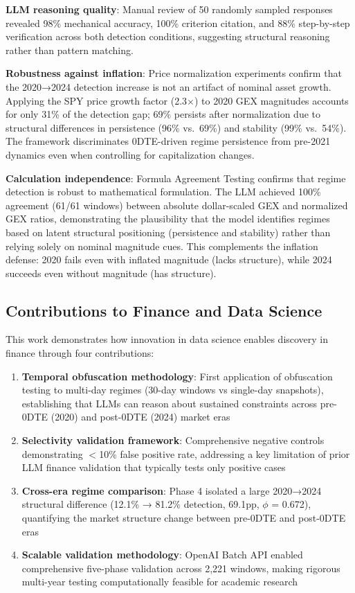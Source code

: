 \textbf{LLM reasoning quality}: Manual review of 50 randomly sampled responses revealed 98\% mechanical accuracy, 100\% criterion citation, and 88\% step-by-step verification across both detection conditions, suggesting structural reasoning rather than pattern matching.

\textbf{Robustness against inflation}: Price normalization experiments confirm that the 2020→2024 detection increase is not an artifact of nominal asset growth. Applying the SPY price growth factor (2.3$\times$) to 2020 GEX magnitudes accounts for only 31\% of the detection gap; 69\% persists after normalization due to structural differences in persistence (96\% vs.\ 69\%) and stability (99\% vs.\ 54\%). The framework discriminates 0DTE-driven regime persistence from pre-2021 dynamics even when controlling for capitalization changes.

\textbf{Calculation independence}: Formula Agreement Testing confirms that regime detection is robust to mathematical formulation. The LLM achieved 100\% agreement (61/61 windows) between absolute dollar-scaled GEX and normalized GEX ratios, demonstrating the plausibility that the model identifies regimes based on latent structural positioning (persistence and stability) rather than relying solely on nominal magnitude cues. This complements the inflation defense: 2020 fails even with inflated magnitude (lacks structure), while 2024 succeeds even without magnitude (has structure).

\subsection{Contributions to Finance and Data Science}

This work demonstrates how innovation in data science enables discovery in finance through four contributions:

\begin{enumerate}
\item \textbf{Temporal obfuscation methodology}: First application of obfuscation testing to multi-day regimes (30-day windows vs single-day snapshots), establishing that LLMs can reason about sustained constraints across pre-0DTE (2020) and post-0DTE (2024) market eras
\item \textbf{Selectivity validation framework}: Comprehensive negative controls demonstrating $<$10\% false positive rate, addressing a key limitation of prior LLM finance validation that typically tests only positive cases
\item \textbf{Cross-era regime comparison}: Phase 4 isolated a large 2020→2024 structural difference (12.1\% → 81.2\% detection, 69.1pp, $\phi$ = 0.672), quantifying the market structure change between pre-0DTE and post-0DTE eras
\item \textbf{Scalable validation methodology}: OpenAI Batch API enabled comprehensive five-phase validation across 2,221 windows, making rigorous multi-year testing computationally feasible for academic research
\end{enumerate}

